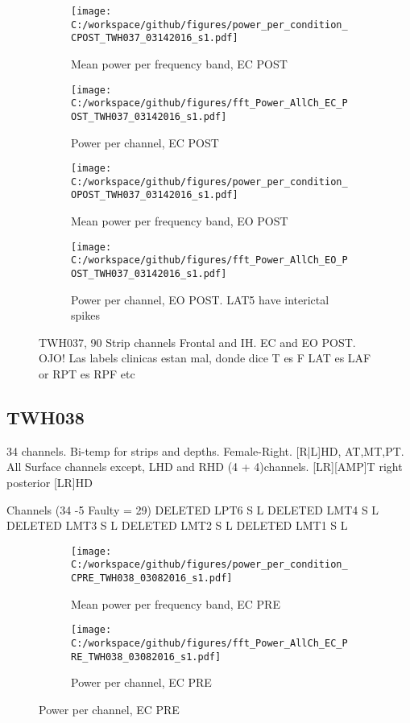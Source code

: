 \documentclass[11pt, onecolumn]{article}
\begin{document}
{%

\begin{figure}[t!] %
\begin{subfigure}{0.48\textwidth}
\texttt{[image: C:/workspace/github/figures/power\_per\_condition\_CPOST\_TWH037\_03142016\_s1.pdf]}
\caption{Mean power per frequency band, EC POST} \label{fig:a}
\end{subfigure}\hspace*{\fill}
\begin{subfigure}{0.48\textwidth}
\texttt{[image: C:/workspace/github/figures/fft\_Power\_AllCh\_EC\_POST\_TWH037\_03142016\_s1.pdf]}
\caption{Power per channel, EC POST} \label{fig:b}
\end{subfigure}

\medskip
\begin{subfigure}{0.48\textwidth}
\texttt{[image: C:/workspace/github/figures/power\_per\_condition\_OPOST\_TWH037\_03142016\_s1.pdf]}
\caption{Mean power per frequency band, EO POST} \label{fig:a}
\end{subfigure}\hspace*{\fill}
\begin{subfigure}{0.48\textwidth}
\texttt{[image: C:/workspace/github/figures/fft\_Power\_AllCh\_EO\_POST\_TWH037\_03142016\_s1.pdf]}
\caption{Power per channel, EO POST. LAT5 have interictal spikes} \label{fig:b}
\end{subfigure}
\caption{TWH037, 
90 Strip channels  Frontal and IH. EC and EO POST. OJO! Las labels clinicas estan mal, donde dice T es F
LAT es LAF or RPT es RPF etc} \label{fig:38PRE}
\end{figure}


\subsection{TWH038}

34 channels. Bi-temp for strips and depths. Female-Right. [R|L]{HD, AT,MT,PT}. All Surface channels except, LHD and RHD (4 + 4)channels.
[LR][AMP]T  right posterior 
[LR]HD

Channels (34 -5 Faulty = 29)
DELETED LPT6 S L
DELETED LMT4 S L
DELETED LMT3 S L
DELETED LMT2 S L
DELETED LMT1 S L


\begin{figure}[t!] %
\begin{subfigure}{0.48\textwidth}
\texttt{[image: C:/workspace/github/figures/power\_per\_condition\_CPRE\_TWH038\_03082016\_s1.pdf]}
\caption{Mean power per frequency band, EC PRE} \label{fig:a}
\end{subfigure}\hspace*{\fill}
\begin{subfigure}{0.48\textwidth}
\texttt{[image: C:/workspace/github/figures/fft\_Power\_AllCh\_EC\_PRE\_TWH038\_03082016\_s1.pdf]}
\caption{Power per channel, EC PRE} \label{fig:b}
\end{subfigure}


\end{figure}}
\end{document}
